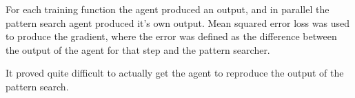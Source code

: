 For each training function the agent produced an output, and in parallel the pattern search agent produced it's own output. Mean squared error loss was used to produce the gradient, where the error was defined as the difference between the output of the agent for that step and the pattern searcher.

It proved quite difficult to actually get the agent to reproduce the output of the pattern search. %





